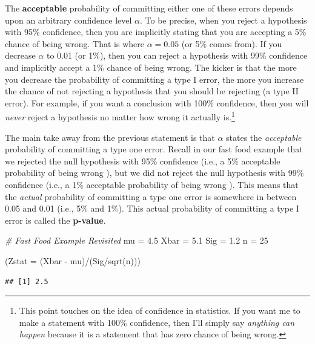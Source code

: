 \documentclass[
]{book}
\newenvironment{Shaded}{\begin{snugshade}}{\end{snugshade}}
\newcommand{\AttributeTok}[1]{\textcolor[rgb]{0.77,0.63,0.00}{#1}}
\newcommand{\CommentTok}[1]{\textcolor[rgb]{0.56,0.35,0.01}{\textit{#1}}}
\newcommand{\DecValTok}[1]{\textcolor[rgb]{0.00,0.00,0.81}{#1}}
\newcommand{\FloatTok}[1]{\textcolor[rgb]{0.00,0.00,0.81}{#1}}
\newcommand{\FunctionTok}[1]{\textcolor[rgb]{0.00,0.00,0.00}{#1}}
\newcommand{\NormalTok}[1]{#1}
\newcommand{\OtherTok}[1]{\textcolor[rgb]{0.56,0.35,0.01}{#1}}
\newcommand{\SpecialCharTok}[1]{\textcolor[rgb]{0.00,0.00,0.00}{#1}}
\begin{document}
The \textbf{acceptable} probability of committing either one of these errors depends upon an arbitrary confidence level \(\alpha\). To be precise, when you reject a hypothesis with 95\% confidence, then you are implicitly stating that you are accepting a 5\% chance of being wrong. That is where \(\alpha=0.05\) (or 5\% comes from). If you decrease \(\alpha\) to 0.01 (or 1\%), then you can reject a hypothesis with 99\% confidence and implicitly accept a 1\% chance of being wrong. The kicker is that the more you decrease the probability of committing a type I error, the more you increase the chance of not rejecting a hypothesis that you should be rejecting (a type II error). For example, if you want a conclusion with 100\% confidence, then you will \emph{never} reject a hypothesis no matter how wrong it actually is.\footnote{This point touches on the idea of confidence in statistics. If you want me to make a statement with 100\% confidence, then I'll simply say \emph{anything can happen} because it is a statement that has zero chance of being wrong.}

The main take away from the previous statement is that \(\alpha\) states the \emph{acceptable} probability of committing a type one error. Recall in our fast food example that we rejected the null hypothesis with 95\% confidence (i.e., a 5\% acceptable probability of being wrong ), but we did not reject the null hypothesis with 99\% confidence (i.e., a 1\% acceptable probability of being wrong ). This means that the \emph{actual} probability of committing a type one error is somewhere in between 0.05 and 0.01 (i.e., 5\% and 1\%). This actual probability of committing a type I error is called the \textbf{p-value}.

\begin{Shaded}
\begin{Highlighting}[]
\CommentTok{\# Fast Food Example Revisited}
\NormalTok{mu }\OtherTok{=} \FloatTok{4.5}
\NormalTok{Xbar }\OtherTok{=} \FloatTok{5.1}
\NormalTok{Sig }\OtherTok{=} \FloatTok{1.2}
\NormalTok{n }\OtherTok{=} \DecValTok{25}

\NormalTok{(}\AttributeTok{Zstat =}\NormalTok{ (Xbar }\SpecialCharTok{{-}}\NormalTok{ mu)}\SpecialCharTok{/}\NormalTok{(Sig}\SpecialCharTok{/}\FunctionTok{sqrt}\NormalTok{(n)))}
\end{Highlighting}
\end{Shaded}

\begin{verbatim}
## [1] 2.5
\end{verbatim}
\end{document}
